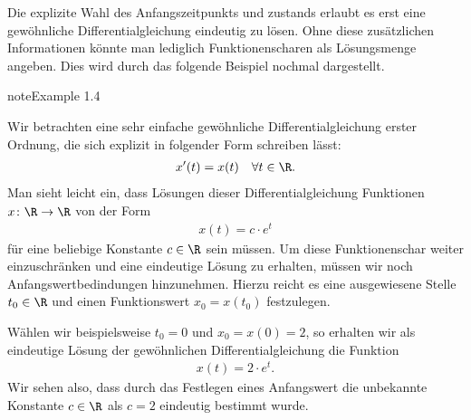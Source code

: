 \documentclass[letterpaper,10pt,english]{jupyterBook}
\begin{document}
\sphinxAtStartPar
Die explizite Wahl des Anfangszeitpunkts und \sphinxhyphen{}zustands erlaubt es erst eine gewöhnliche Differentialgleichung eindeutig zu lösen.
Ohne diese zusätzlichen Informationen könnte man lediglich Funktionenscharen als Lösungsmenge angeben.
Dies wird durch das folgende Beispiel nochmal dargestellt.
\label{ode/repetition:example-6}
\begin{sphinxadmonition}{note}{Example 1.4}



\sphinxAtStartPar
Wir betrachten eine sehr einfache gewöhnliche Differentialgleichung erster Ordnung, die sich explizit in folgender Form schreiben lässt:
\begin{equation*}
\begin{split}x'(t) = x(t) \quad \forall t \in \R.\end{split}
\end{equation*}
\sphinxAtStartPar
Man sieht leicht ein, dass Lösungen dieser Differentialgleichung Funktionen \(x \colon \R \rightarrow \R\) von der Form
\begin{equation*}
\begin{split}x(t) = c\cdot e^t\end{split}
\end{equation*}
\sphinxAtStartPar
für eine beliebige Konstante \(c \in \R\) sein müssen.
Um diese Funktionenschar weiter einzuschränken und eine eindeutige Lösung zu erhalten, müssen wir noch Anfangswertbedindungen hinzunehmen.
Hierzu reicht es eine ausgewiesene Stelle \(t_0 \in \R\) und einen Funktionswert \(x_0 = x(t_0)\) festzulegen.

\sphinxAtStartPar
Wählen wir beispielsweise \(t_0 = 0\) und \(x_0 = x(0) = 2\), so erhalten wir als eindeutige Lösung der gewöhnlichen Differentialgleichung die Funktion
\begin{equation*}
\begin{split}x(t) = 2\cdot e^t.\end{split}
\end{equation*}
\sphinxAtStartPar
Wir sehen also, dass durch das Festlegen eines Anfangswert die unbekannte Konstante \(c \in \R\) als \(c=2\) eindeutig bestimmt wurde.
\end{sphinxadmonition}
\end{document}
